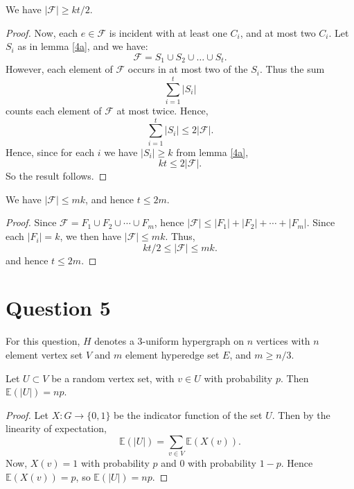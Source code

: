 \documentclass{unswmaths}
\begin{document}
\begin{corollary}[Part (b)]
    We have $|\mathcal{F}| \geq kt/2$.
\end{corollary}
\begin{proof}
    Now, each $e \in \mathcal{F}$ is incident with at least one $C_i$, and at
    most two $C_i$. Let $S_i$ as in lemma \ref{4a}, and we have:
    \begin{equation*}
        \mathcal{F} = S_1\cup S_2\cup \ldots \cup S_t. 
    \end{equation*}
    However, each element of $\mathcal{F}$ occurs in at most two of the $S_i$. 
    Thus the sum
    \begin{equation*}
       \sum_{i=1}^t |S_i|
    \end{equation*}
    counts each element of $\mathcal{F}$ at most twice. Hence,
    \begin{equation*}
        \sum_{i=1}^t |S_i| \leq 2|\mathcal{F}|.
    \end{equation*}
    Hence, since for each $i$ we have $|S_i| \geq k$ from lemma \ref{4a}, 
    \begin{equation*}
        kt \leq 2|\mathcal{F}|.
    \end{equation*}
    So the result follows.
\end{proof}

\begin{corollary}[Part (c)]
    We have $|\mathcal{F}| \leq mk$, and hence $t \leq 2m$.
\end{corollary}
\begin{proof}
    Since $\mathcal{F} = F_1\cup F_2\cup\cdots\cup F_m$, hence $|\mathcal{F}| \leq |F_1|+|F_2|+\cdots+|F_m|$. 
    Since each $|F_i| = k$, we then have $|\mathcal{F}| \leq mk$. 
    Thus,
    \begin{equation*}
        kt/2 \leq |\mathcal{F}| \leq mk.
    \end{equation*}
    and hence $t \leq 2m$. 
\end{proof}


\section*{Question 5}

For this question, $H$ denotes a $3$-uniform hypergraph
on $n$ vertices with $n$ element vertex set $V$
and $m$ element hyperedge set $E$, and $m \geq n/3$.

\begin{lemma}[Part (a)]
    \label{5a}
    Let $U \subset V$ be a random vertex set, with $v \in U$
    with probability $p$. Then $\mathbb{E}(|U|) = np$.
\end{lemma}
\begin{proof}
    Let $X:G\to \{0,1\}$ be the indicator function of the set $U$.
    Then by the linearity of expectation,
    \begin{equation*}
        \mathbb{E}(|U|) = \sum_{v \in V} \mathbb{E}(X(v)).
    \end{equation*}
    Now, $X(v) = 1$ with probability $p$ and $0$ with probability $1-p$.
    Hence $\mathbb{E}(X(v)) = p$, so $\mathbb{E}(|U|) = np$.
\end{proof}
\end{document}
